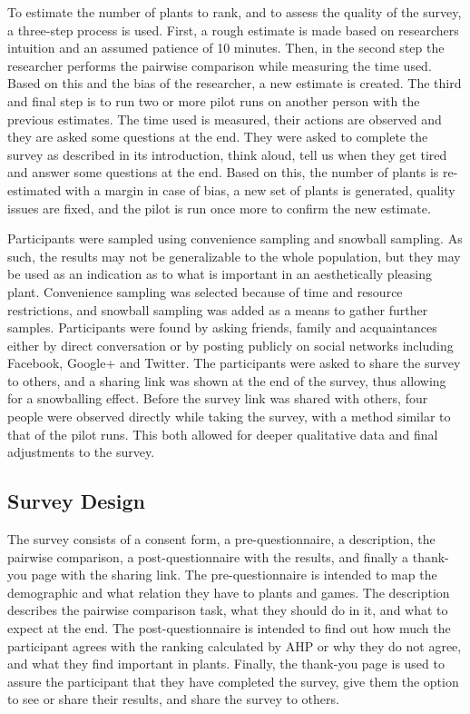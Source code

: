 To estimate the number of plants to rank, and to assess the quality of the survey, a three-step process is used.
First, a rough estimate is made based on researchers intuition and an assumed patience of 10 minutes.
Then, in the second step the researcher performs the pairwise comparison while measuring the time used.
Based on this and the bias of the researcher, a new estimate is created.
The third and final step is to run two or more pilot runs on another person with the previous estimates.
The time used is measured, their actions are observed and they are asked some questions at the end.
They were asked to complete the survey as described in its introduction, think aloud, tell us when they get tired and answer some questions at the end.
Based on this, the number of plants is re-estimated with a margin in case of bias, a new set of plants is generated, quality issues are fixed, and the pilot is run once more to confirm the new estimate.

Participants were sampled using convenience sampling and snowball sampling.
As such, the results may not be generalizable to the whole population, but they may be used as an indication as to what is important in an aesthetically pleasing plant.
Convenience sampling was selected because of time and resource restrictions, and snowball sampling was added as a means to gather further samples.
Participants were found by asking friends, family and acquaintances either by direct conversation or by posting publicly on social networks including Facebook, Google+ and Twitter.
The participants were asked to share the survey to others, and a sharing link was shown at the end of the survey, thus allowing for a snowballing effect.
Before the survey link was shared with others, four people were observed directly while taking the survey, with a method similar to that of the pilot runs.
This both allowed for deeper qualitative data and final adjustments to the survey.

\subsection{Survey Design}
\label{sec:survey-design}
The survey consists of a consent form, a pre-questionnaire, a description, the pairwise comparison, a post-questionnaire with the results, and finally a thank-you page with the sharing link.
The pre-questionnaire is intended to map the demographic and what relation they have to plants and games.
The description describes the pairwise comparison task, what they should do in it, and what to expect at the end.
The post-questionnaire is intended to find out how much the participant agrees with the ranking calculated by \gls{AHP} or why they do not agree, and what they find important in plants.
Finally, the thank-you page is used to assure the participant that they have completed the survey, give them the option to see or share their results, and share the survey to others.

